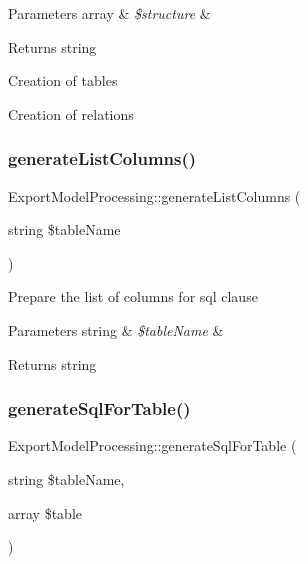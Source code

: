 \begin{DoxyParams}[1]{Parameters}
array & {\em \$structure} & \\
\hline
\end{DoxyParams}
\begin{DoxyReturn}{Returns}
string 
\end{DoxyReturn}
Creation of tables

Creation of relations\mbox{\label{classExportModelProcessing_a66a3f33cd27c03c19b07f4074bab3cd8}} 
\subsubsection{\texorpdfstring{generate\+List\+Columns()}{generateListColumns()}}
{\footnotesize\ttfamily Export\+Model\+Processing\+::generate\+List\+Columns (\begin{DoxyParamCaption}\item[{string}]{\$table\+Name }\end{DoxyParamCaption})}

Prepare the list of columns for sql clause


\begin{DoxyParams}[1]{Parameters}
string & {\em \$table\+Name} & \\
\hline
\end{DoxyParams}
\begin{DoxyReturn}{Returns}
string 
\end{DoxyReturn}
\mbox{\label{classExportModelProcessing_adfa4dd7271ec720245cb2f6845b983cc}} 
\subsubsection{\texorpdfstring{generate\+Sql\+For\+Table()}{generateSqlForTable()}}
{\footnotesize\ttfamily Export\+Model\+Processing\+::generate\+Sql\+For\+Table (\begin{DoxyParamCaption}\item[{string}]{\$table\+Name,  }\item[{array}]{\$table }\end{DoxyParamCaption})}

